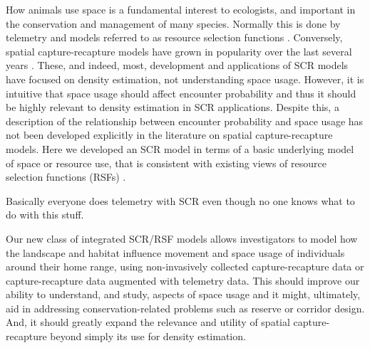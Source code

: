 How animals use space is a fundamental interest to ecologists, and
important in the conservation and management of many species.
Normally this is done by telemetry and models referred to as resource
selection functions \citep{manly_etal:2002}.  Conversely, spatial
capture-recapture models have grown in popularity over the last
several years \citep{efford:2004,borchers_efford:2008, royle:2008,
  efford_etal:2009ecol,royle_etal:2009ecol, gardner_etal:2010ecol,
  gardner_etal:2010jwm, kery_etal:2010,
  sollmann_etal:2011,mollet_etal:2012,gopalaswamy_etal:2012ecol}. These,
and indeed, most, development and applications of SCR models have
focused on density estimation, not understanding space usage.
However, it is intuitive that space usage should affect encounter
probability and thus it should be highly relevant to density
estimation in SCR applications. Despite this, a description of the
relationship between encounter probability and space usage has not
been developed explicitly in the literature on spatial
capture-recapture models.  Here we developed an SCR model in terms of
a basic underlying model of space or resource use, that is consistent
with existing views of resource selection functions (RSFs)
\citep{manly_etal:2002}.

Basically everyone does telemetry with SCR even though no one knows
what to do with this stuff.

Our new class of integrated SCR/RSF models allows investigators to model how the landscape and
habitat influence movement and space usage of individuals around their
home range, using non-invasively collected capture-recapture data or
capture-recapture data augmented with telemetry data.  This should
improve our ability to understand, and study, aspects of space usage
and it might, ultimately, aid in addressing conservation-related
problems such as reserve or corridor design. And, it should greatly
expand the relevance and utility of spatial capture-recapture beyond
simply its use for density estimation.


